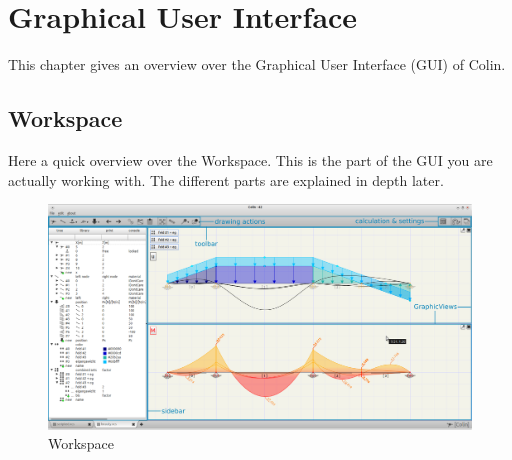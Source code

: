 \documentclass[a4paper,11pt]{report}
\begin{document}
\chapter{Graphical User Interface}

This chapter gives an overview over the Graphical User Interface (GUI) of Colin.

\section{Workspace}
\label{sec:workspace}

Here a quick overview over the Workspace. This is the part of the GUI you are actually working with. The different parts are explained in depth later.
\begin{figure}[H]
\includegraphics[width=\textwidth]{../pictures/workspace_overlay.png}
\caption{Workspace}
\label{pic:workspace}
\end{figure}
\end{document}
